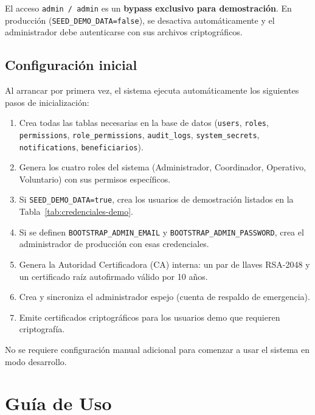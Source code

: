 \documentclass[10pt,letterpaper]{report}
\begin{document}
\begin{warningbox}[Importante]
  El acceso \texttt{admin / admin} es un \textbf{bypass exclusivo para demostración}. En producción (\texttt{SEED\_DEMO\_DATA=false}), se desactiva automáticamente y el administrador debe autenticarse con sus archivos criptográficos.
\end{warningbox}

\section{Configuración inicial}

Al arrancar por primera vez, el sistema ejecuta automáticamente los siguientes pasos de inicialización:

\begin{enumerate}[leftmargin=2cm]
  \item Crea todas las tablas necesarias en la base de datos (\texttt{users}, \texttt{roles}, \texttt{permissions}, \texttt{role\_permissions}, \texttt{audit\_logs}, \texttt{system\_secrets}, \texttt{notifications}, \texttt{beneficiarios}).
  \item Genera los cuatro roles del sistema (Administrador, Coordinador, Operativo, Voluntario) con sus permisos específicos.
  \item Si \texttt{SEED\_DEMO\_DATA=true}, crea los usuarios de demostración listados en la Tabla~\ref{tab:credenciales-demo}.
  \item Si se definen \texttt{BOOTSTRAP\_ADMIN\_EMAIL} y \texttt{BOOTSTRAP\_ADMIN\_PASSWORD}, crea el administrador de producción con esas credenciales.
  \item Genera la Autoridad Certificadora (CA) interna: un par de llaves RSA-2048 y un certificado raíz autofirmado válido por 10 años.
  \item Crea y sincroniza el administrador espejo (cuenta de respaldo de emergencia).
  \item Emite certificados criptográficos para los usuarios demo que requieren criptografía.
\end{enumerate}

No se requiere configuración manual adicional para comenzar a usar el sistema en modo desarrollo.

\chapter{Guía de Uso}
\end{document}
